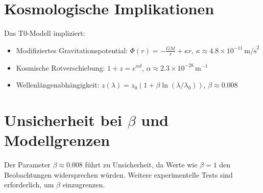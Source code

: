 \documentclass{article}
\theoremstyle{definition}
\theoremstyle{remark}
\begin{document}
	\section{Kosmologische Implikationen}
	Das T0-Modell impliziert:
	\begin{itemize}
		\item Modifiziertes Gravitationspotential: \( \Phi(r) = -\frac{GM}{r} + \kappa r \), \( \kappa \approx 4.8 \times 10^{-11} \, \text{m/s}^2 \)
		\item Kosmische Rotverschiebung: \( 1 + z = e^{\alpha d} \), \( \alpha \approx 2.3 \times 10^{-28} \, \text{m}^{-1} \)
		\item Wellenlängenabhängigkeit: \( z(\lambda) = z_0 (1 + \beta \ln(\lambda/\lambda_0)) \), \( \beta \approx 0.008 \)
	\end{itemize}
	
	\section{Unsicherheit bei \(\beta\) und Modellgrenzen}
	Der Parameter \( \beta \approx 0.008 \) führt zu Unsicherheit, da Werte wie \( \beta = 1 \) den Beobachtungen widersprechen würden. Weitere experimentelle Tests sind erforderlich, um \( \beta \) einzugrenzen.
	
\end{document}
